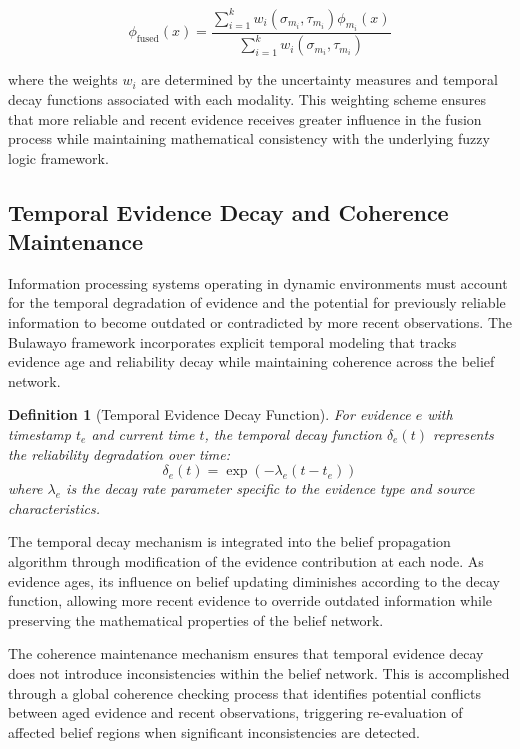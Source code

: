 \documentclass[12pt,a4paper]{article}
\newtheorem{definition}[theorem]{Definition}
\begin{document}
\begin{equation}
\phi_{\text{fused}}(x) = \frac{\sum_{i=1}^{k} w_i(\sigma_{m_i}, \tau_{m_i}) \phi_{m_i}(x)}{\sum_{i=1}^{k} w_i(\sigma_{m_i}, \tau_{m_i})}
\end{equation}

where the weights $w_i$ are determined by the uncertainty measures and temporal decay functions associated with each modality. This weighting scheme ensures that more reliable and recent evidence receives greater influence in the fusion process while maintaining mathematical consistency with the underlying fuzzy logic framework.

\subsection{Temporal Evidence Decay and Coherence Maintenance}

Information processing systems operating in dynamic environments must account for the temporal degradation of evidence and the potential for previously reliable information to become outdated or contradicted by more recent observations. The Bulawayo framework incorporates explicit temporal modeling that tracks evidence age and reliability decay while maintaining coherence across the belief network.

\begin{definition}[Temporal Evidence Decay Function]
For evidence $e$ with timestamp $t_e$ and current time $t$, the temporal decay function $\delta_e(t)$ represents the reliability degradation over time:
\begin{equation}
\delta_e(t) = \exp\left(-\lambda_e (t - t_e)\right)
\end{equation}
where $\lambda_e$ is the decay rate parameter specific to the evidence type and source characteristics.
\end{definition}

The temporal decay mechanism is integrated into the belief propagation algorithm through modification of the evidence contribution at each node. As evidence ages, its influence on belief updating diminishes according to the decay function, allowing more recent evidence to override outdated information while preserving the mathematical properties of the belief network.

The coherence maintenance mechanism ensures that temporal evidence decay does not introduce inconsistencies within the belief network. This is accomplished through a global coherence checking process that identifies potential conflicts between aged evidence and recent observations, triggering re-evaluation of affected belief regions when significant inconsistencies are detected.
\end{document}
